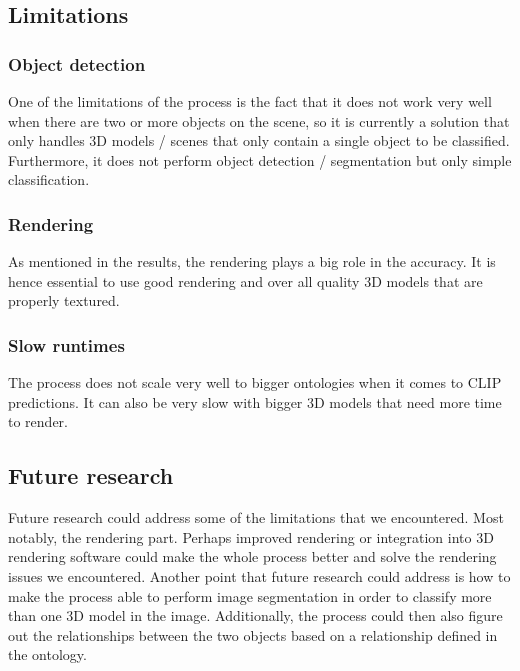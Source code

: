 \documentclass[a4paper,11pt,oneside]{article}
\begin{document}
  \subsection{Limitations}
  \subsubsection{Object detection}
  One of the limitations of the process is the fact that it does not work very well when there are two or more objects on the scene, so it is currently a solution that only handles 3D models / scenes that only contain a single object to be classified. Furthermore, it does not perform object detection / segmentation but only simple classification.
  \subsubsection{Rendering}
  As mentioned in the results, the rendering plays a big role in the accuracy. It is hence essential to use good rendering and over all quality 3D models that are properly textured.
  \subsubsection{Slow runtimes}
  The process does not scale very well to bigger ontologies when it comes to CLIP predictions. It can also be very slow with bigger 3D models that need more time to render. 
  \subsection{Future research}
  Future research could address some of the limitations that we encountered. Most notably, the rendering part. Perhaps improved rendering or integration into 3D rendering software could make the whole process better and solve the rendering issues we encountered. Another point that future research could address is how to make the process able to perform image segmentation in order to classify more than one 3D model in the image. Additionally, the process could then also figure out the relationships between the two objects based on a relationship defined in the ontology.
  
\end{document}
